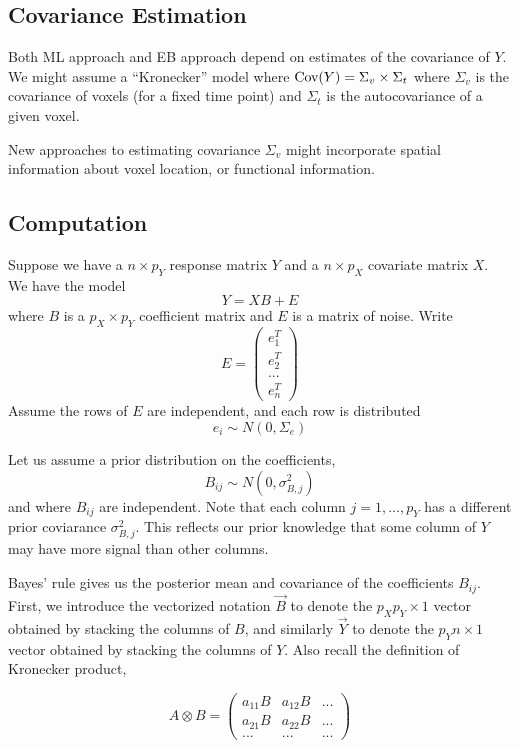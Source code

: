 \documentclass[12pt]{article}
\begin{document}
\subsection{Covariance Estimation}

Both ML approach and EB approach depend on estimates of the covariance of $Y$.
We might assume a ``Kronecker'' model where $\text{Cov}(Y) = \Sigma_v \times \Sigma_t$
where $\Sigma_v$ is the covariance of voxels (for a fixed time point)
and $\Sigma_t$ is the autocovariance of a given voxel.

New approaches to estimating covariance $\Sigma_v$ might incorporate
spatial information about voxel location, or functional information.

\subsection{Computation}

Suppose we have a $n \times p_Y$ response matrix $Y$ and a $n \times p_X$ covariate matrix $X$.
We have the model
$$
Y = XB + E
$$
where $B$ is a $p_X \times p_Y$ coefficient matrix and $E$ is a matrix of noise.
Write $$
E = \begin{pmatrix} e_1^T\\e_2^T\\ ... \\ e_n^T \end{pmatrix}
$$
Assume the rows of $E$ are independent, and each row is distributed
$$
e_i \sim N(0, \Sigma_e)
$$

Let us assume a prior distribution on the coefficients,
$$
B_{ij} \sim N(0, \sigma^2_{B, j})
$$
and where $B_{ij}$ are independent.
Note that each column $j = 1,...,p_Y$ has a different prior coviarance $\sigma^2_{B, j}$.
This reflects our prior knowledge that some column of $Y$ may have more signal than other columns.

Bayes' rule gives us the posterior mean and covariance of the coefficients $B_{ij}$.
First, we introduce the vectorized notation $\vec{B}$ to denote the $p_X p_Y \times 1$ vector obtained by 
stacking the columns of $B$, and similarly $\vec{Y}$ to denote the $p_Y n \times 1$ vector obtained by stacking the columns of $Y$.  Also recall the definition of Kronecker product,

$$
A \otimes B = \begin{pmatrix}a_{11} B & a_{12} B & ...\\
a_{21} B & a_{22} B & ...\\
... & ... & ...\end{pmatrix}
$$
\end{document}
